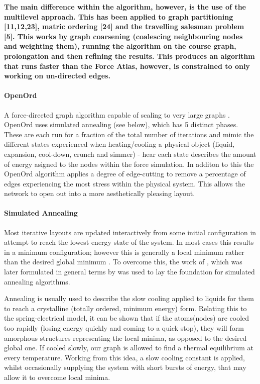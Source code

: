\newpage

\textbf{The main difference within the algorithm, however, is the use of the multilevel approach. This has been applied to graph partitioning [11,12,23], matric ordering [24] and the travelling salesman problem [5]. This works by graph coarsening (coalescing neighbouring nodes and weighting them), running the algorithm on the course graph, prolongation and then refining the results. This produces an algorithm that runs faster than the Force Atlas, however, is constrained to only working on un-directed edges.
}

\paragraph{OpenOrd}
A force-directed graph algorithm capable of scaling to very large graphs \citep{openord}. OpenOrd uses simulated annealing (see below), which has 5 distinct phases. These are each run for a fraction of the total number of iterations and mimic the different states experienced when heating/cooling a physical object (liquid, expansion, cool-down, crunch and simmer) - hear each state describes the amount of energy asigned to the nodes within the force simulation. In additon to this the OpenOrd algorithm applies a degree of edge-cutting to remove a percentage of edges experiencing the most stress within the physical system. This allows the network to open out into a more aesthetically pleasing layout. 


\paragraph*{Simulated Annealing}
Most iterative layouts are updated interactively from some initial configuration in attempt to reach the lowest energy state of the system. In most cases this results in a minimum configuration; however this is generally a local minimum rather than the desired global minimum \citep{nicelyanneal}. To overcome this, the work of \cite{metropolis}, which was later formulated in general terms by \citep{kirkpatrick} was used to lay the foundation for simulated annealing algorithms.

Annealing is usually used to describe the slow cooling applied to liquids for them to reach a crystalline (totally ordered, minimum energy) form. Relating this to the spring-electrical model, it can be shown that if the atoms(nodes) are cooled too rapidly (losing energy quickly and coming to a quick stop), they will form amorphous structures representing the local minima, as opposed to the desired global one.  If cooled slowly, our graph is allowed to find a thermal equilibrium at every temperature. Working from this idea, a slow cooling constant is applied, whilst occasionally supplying the system with short bursts of energy, that may allow it to overcome local minima. 


